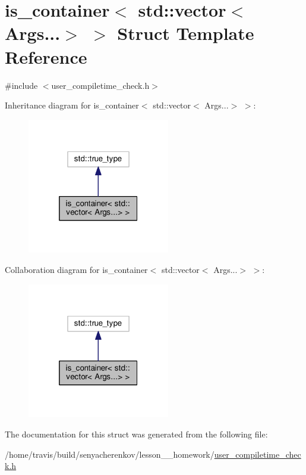 \hypertarget{structis__container_3_01std_1_1vector_3_01Args_8_8_8_4_01_4}{\section{is\-\_\-container$<$ std\-:\-:vector$<$ Args...$>$ $>$ Struct Template Reference}
\label{structis__container_3_01std_1_1vector_3_01Args_8_8_8_4_01_4}
}


{\ttfamily \#include $<$user\-\_\-compiletime\-\_\-check.\-h$>$}



Inheritance diagram for is\-\_\-container$<$ std\-:\-:vector$<$ Args...$>$ $>$\-:
\nopagebreak
\begin{figure}[H]
\begin{center}
\leavevmode
\includegraphics[width=176pt]{structis__container_3_01std_1_1vector_3_01Args_8_8_8_4_01_4__inherit__graph}
\end{center}
\end{figure}


Collaboration diagram for is\-\_\-container$<$ std\-:\-:vector$<$ Args...$>$ $>$\-:
\nopagebreak
\begin{figure}[H]
\begin{center}
\leavevmode
\includegraphics[width=176pt]{structis__container_3_01std_1_1vector_3_01Args_8_8_8_4_01_4__coll__graph}
\end{center}
\end{figure}


The documentation for this struct was generated from the following file\-:\begin{DoxyCompactItemize}
\item 
/home/travis/build/senyacherenkov/lesson\-\_\-\_\-homework/\hyperlink{user__compiletime__check_8h}{user\-\_\-compiletime\-\_\-check.\-h}\end{DoxyCompactItemize}
